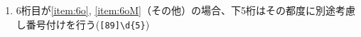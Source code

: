 \begin{enumerate}[label=\alph*)]
\begin{enumerate}[label=\arabic*., ref=\arabic*, start=0]
  \item\label{item:5Kaux} 加工の種類に依存しない加工のプログラム(\verb|40\d{4}|)
  \item\label{item:5KF} 端面の加工のプログラム(\verb|41\d{4}|)
  \item\label{item:5KO} 外削の加工のプログラム(\verb|42\d{4}|)
  \item\label{item:5KK} 溝の加工のプログラム(\verb|43\d{4}|)
  \item\label{item:5KCO} 外側面取の加工のプログラム(\verb|44\d{4}|)
  \item\label{item:5KCI} 内側面取の加工のプログラム(\verb|45\d{4}|)
  \item\label{item:5KZ} 座ぐりの加工のプログラム(\verb|46\d{4}|)
  \end{enumerate}
\item 6桁目が\ref{item:6o}, \ref{item:6oM}（その他）の場合、下5桁はその都度に別途考慮し番号付けを行う(\verb|[89]\d{5}|)
\end{enumerate}


